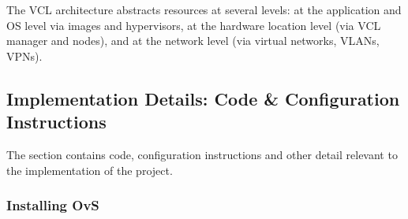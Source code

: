 \documentclass[12pt]{extarticle}
\begin{document}
The VCL architecture abstracts resources at several levels: at the application and OS level via images and hypervisors, at the hardware location level (via VCL manager and nodes), and at the network level (via virtual networks, VLANs, VPNs).

\subsection{Implementation Details: Code \& Configuration Instructions}

The section contains code, configuration instructions and other detail relevant to the implementation of the project.

\subsubsection{Installing OvS} \label{ovs_install}
\end{document}
